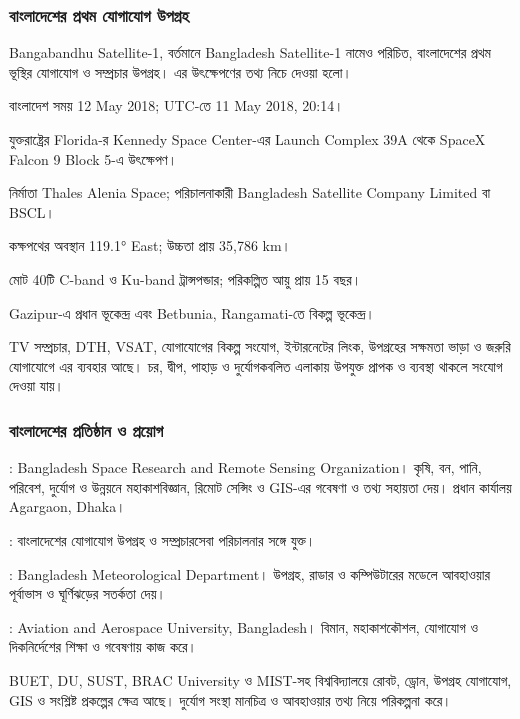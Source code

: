 \subsubsection{বাংলাদেশের প্রথম যোগাযোগ উপগ্রহ}
Bangabandhu Satellite-1, বর্তমানে Bangladesh Satellite-1 নামেও পরিচিত, বাংলাদেশের প্রথম ভূস্থির যোগাযোগ ও সম্প্রচার উপগ্রহ। এর উৎক্ষেপণের তথ্য নিচে দেওয়া হলো।
\begin{compactpoints}
\item বাংলাদেশ সময় 12 May 2018; UTC-তে 11 May 2018, 20:14।
\item যুক্তরাষ্ট্রের Florida-র Kennedy Space Center-এর Launch Complex 39A থেকে SpaceX Falcon 9 Block 5-এ উৎক্ষেপণ।
\item নির্মাতা Thales Alenia Space; পরিচালনাকারী Bangladesh Satellite Company Limited বা BSCL।
\item কক্ষপথের অবস্থান 119.1° East; উচ্চতা প্রায় 35,786 km।
\item মোট 40টি C-band ও Ku-band ট্রান্সপন্ডার; পরিকল্পিত আয়ু প্রায় 15 বছর।
\item Gazipur-এ প্রধান ভূকেন্দ্র এবং Betbunia, Rangamati-তে বিকল্প ভূকেন্দ্র।
\end{compactpoints}
TV সম্প্রচার, DTH, VSAT, যোগাযোগের বিকল্প সংযোগ, ইন্টারনেটের লিংক, উপগ্রহের সক্ষমতা ভাড়া ও জরুরি যোগাযোগে এর ব্যবহার আছে। চর, দ্বীপ, পাহাড় ও দুর্যোগকবলিত এলাকায় উপযুক্ত প্রাপক ও ব্যবস্থা থাকলে সংযোগ দেওয়া যায়।
\subsubsection{বাংলাদেশের প্রতিষ্ঠান ও প্রয়োগ}
\begin{compactpoints}
\item {}: Bangladesh Space Research and Remote Sensing Organization। কৃষি, বন, পানি, পরিবেশ, দুর্যোগ ও উন্নয়নে মহাকাশবিজ্ঞান, রিমোট সেন্সিং ও GIS-এর গবেষণা ও তথ্য সহায়তা দেয়। প্রধান কার্যালয় Agargaon, Dhaka।
\item {}: বাংলাদেশের যোগাযোগ উপগ্রহ ও সম্প্রচারসেবা পরিচালনার সঙ্গে যুক্ত।
\item {}: Bangladesh Meteorological Department। উপগ্রহ, রাডার ও কম্পিউটারের মডেলে আবহাওয়ার পূর্বাভাস ও ঘূর্ণিঝড়ের সতর্কতা দেয়।
\item {}: Aviation and Aerospace University, Bangladesh। বিমান, মহাকাশকৌশল, যোগাযোগ ও দিকনির্দেশের শিক্ষা ও গবেষণায় কাজ করে।
\item BUET, DU, SUST, BRAC University ও MIST-সহ বিশ্ববিদ্যালয়ে রোবট, ড্রোন, উপগ্রহ যোগাযোগ, GIS ও সংশ্লিষ্ট প্রকল্পের ক্ষেত্র আছে। দুর্যোগ সংস্থা মানচিত্র ও আবহাওয়ার তথ্য নিয়ে পরিকল্পনা করে।
\end{compactpoints}
